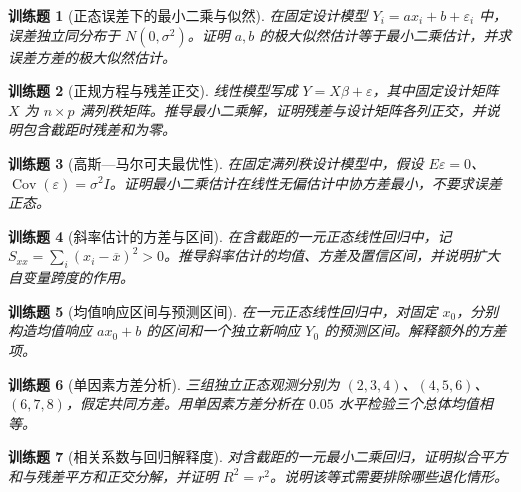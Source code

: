 \documentclass[UTF8,12pt,a4paper,fontset=fandol]{ctexbook}
\newtheorem{exercise}{训练题}[section]
\begin{document}
\begin{exercise}[正态误差下的最小二乘与似然]\label{q:M-C26-2d}
在固定设计模型 $Y_i=ax_i+b+\varepsilon_i$ 中，误差独立同分布于 $N(0,\sigma^2)$。证明 $a,b$ 的极大似然估计等于最小二乘估计，并求误差方差的极大似然估计。\par{}\end{exercise}

\begin{exercise}[正规方程与残差正交]\label{q:B16.1}
线性模型写成 $Y=X\beta+\varepsilon$，其中固定设计矩阵 $X$ 为 $n\times p$ 满列秩矩阵。推导最小二乘解，证明残差与设计矩阵各列正交，并说明包含截距时残差和为零。\par{}\end{exercise}

\begin{exercise}[高斯—马尔可夫最优性]\label{q:B16.2}
在固定满列秩设计模型中，假设 $E\varepsilon=0$、$\operatorname{Cov}(\varepsilon)=\sigma^2I$。证明最小二乘估计在线性无偏估计中协方差最小，不要求误差正态。\par{}\end{exercise}

\begin{exercise}[斜率估计的方差与区间]\label{q:B16.3}
在含截距的一元正态线性回归中，记 $S_{xx}=\sum_i(x_i-\overline x)^2>0$。推导斜率估计的均值、方差及置信区间，并说明扩大自变量跨度的作用。\par{}\end{exercise}

\begin{exercise}[均值响应区间与预测区间]\label{q:B16.4}
在一元正态线性回归中，对固定 $x_0$，分别构造均值响应 $a x_0+b$ 的区间和一个独立新响应 $Y_0$ 的预测区间。解释额外的方差项。\par{}\end{exercise}

\begin{exercise}[单因素方差分析]\label{q:B16.5}
三组独立正态观测分别为 $(2,3,4)$、$(4,5,6)$、$(6,7,8)$，假定共同方差。用单因素方差分析在 $0.05$ 水平检验三个总体均值相等。\par{}\end{exercise}

\begin{exercise}[相关系数与回归解释度]\label{q:B16.6}
对含截距的一元最小二乘回归，证明拟合平方和与残差平方和正交分解，并证明 $R^2=r^2$。说明该等式需要排除哪些退化情形。\par{}\end{exercise}
\end{document}
